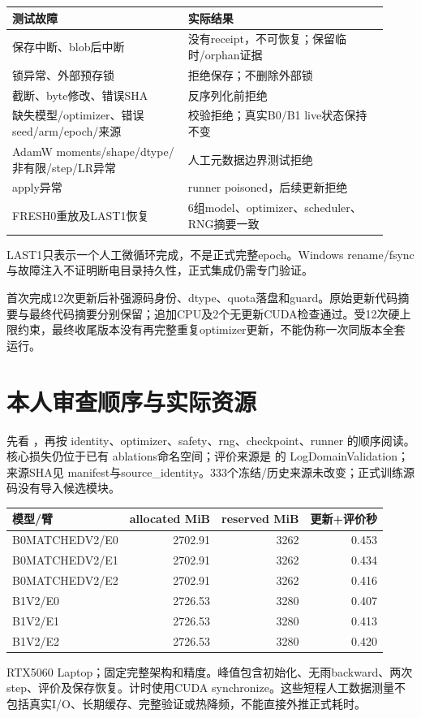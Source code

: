 \documentclass[UTF8,11pt,a4paper]{ctexart}
\begin{document}
\begin{longtable}{>{\raggedright\arraybackslash}p{0.43\linewidth}>{\raggedright\arraybackslash}p{0.49\linewidth}}\toprule
测试故障&实际结果\\\midrule
保存中断、blob后中断&没有receipt，不可恢复；保留临时/orphan证据\\
锁异常、外部预存锁&拒绝保存；不删除外部锁\\
截断、byte修改、错误SHA&反序列化前拒绝\\
缺失模型/optimizer、错误seed/arm/epoch/来源&校验拒绝；真实B0/B1 live状态保持不变\\
AdamW moments/shape/dtype/非有限/step/LR异常&人工元数据边界测试拒绝\\
apply异常&runner poisoned，后续更新拒绝\\
FRESH0重放及LAST1恢复&6组model、optimizer、scheduler、RNG摘要一致\\\bottomrule
\end{longtable}
LAST1只表示一个人工微循环完成，不是正式完整epoch。Windows rename/fsync与故障注入不证明断电目录持久性，正式集成仍需专门验证。

首次完成12次更新后补强源码身份、dtype、quota落盘和guard。原始更新代码摘要与最终代码摘要分别保留；追加CPU及2个无更新CUDA检查通过。受12次硬上限约束，最终收尾版本没有再完整重复optimizer更新，不能伪称一次同版本全套运行。

\newpage
\section*{本人审查顺序与实际资源}
先看 ，再按 identity、optimizer、safety、rng、checkpoint、runner 的顺序阅读。核心损失仍位于已有 ablations命名空间；评价来源是  的 LogDomainValidation；来源SHA见 manifest与source\_identity。333个冻结/历史来源未改变；正式训练源码没有导入候选模块。

\begin{center}\small
\begin{tabular}{lrrr}\toprule 模型/臂&allocated MiB&reserved MiB&更新+评价秒\\\midrule
B0MATCHEDV2/E0&2702.91&3262&0.453\\
B0MATCHEDV2/E1&2702.91&3262&0.434\\
B0MATCHEDV2/E2&2702.91&3262&0.416\\
B1V2/E0&2726.53&3280&0.407\\
B1V2/E1&2726.53&3280&0.413\\
B1V2/E2&2726.53&3280&0.420\\
\bottomrule\end{tabular}\end{center}
RTX5060 Laptop；固定完整架构和精度。峰值包含初始化、无雨backward、两次step、评价及保存恢复。计时使用CUDA synchronize。这些短程人工数据测量不包括真实I/O、长期缓存、完整验证或热降频，不能直接外推正式耗时。
\end{document}
